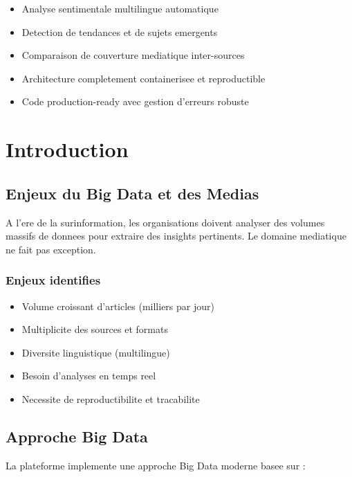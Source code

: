 \documentclass[12pt,a4paper]{report}
\begin{document}
\begin{itemize}
    \item Analyse sentimentale multilingue automatique
    \item Detection de tendances et de sujets emergents
    \item Comparaison de couverture mediatique inter-sources
    \item Architecture completement containerisee et reproductible
    \item Code production-ready avec gestion d'erreurs robuste
\end{itemize}


\chapter{Introduction}

\section{Enjeux du Big Data et des Medias}

A l'ere de la surinformation, les organisations doivent analyser des volumes massifs de donnees pour extraire des insights pertinents. Le domaine mediatique ne fait pas exception.

\subsection{Enjeux identifies}

\begin{itemize}
    \item Volume croissant d'articles (milliers par jour)
    \item Multiplicite des sources et formats
    \item Diversite linguistique (multilingue)
    \item Besoin d'analyses en temps reel
    \item Necessite de reproductibilite et tracabilite
\end{itemize}

\section{Approche Big Data}

La plateforme implemente une approche Big Data moderne basee sur :
\end{document}
